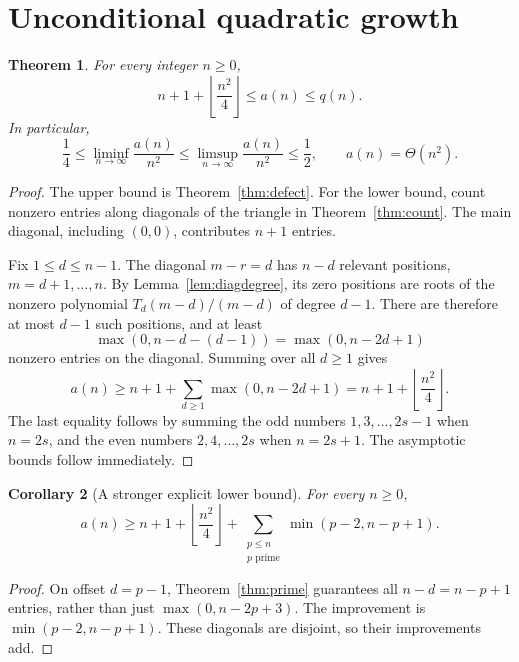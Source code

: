 \documentclass[11pt,a4paper]{article}
\numberwithin{equation}{section}
\newtheorem{theorem}{Theorem}[section]
\newtheorem{corollary}[theorem]{Corollary}
\theoremstyle{definition}
\theoremstyle{remark}
\begin{document}
\section{Unconditional quadratic growth}\label{sec:bounds}

\begin{theorem}\label{thm:bounds}
For every integer $n\ge0$,
\begin{equation}\label{eq:bounds}
 n+1+\left\lfloor\frac{n^2}{4}\right\rfloor\le a(n)\le q(n).
\end{equation}
In particular,
\[
 \frac14\le\liminf_{n\to\infty}\frac{a(n)}{n^2}
 \le\limsup_{n\to\infty}\frac{a(n)}{n^2}\le\frac12,
 \qquad a(n)=\Theta(n^2).
\]
\end{theorem}
\begin{proof}
The upper bound is Theorem~\ref{thm:defect}. For the lower bound, count
nonzero entries along diagonals of the triangle in
Theorem~\ref{thm:count}. The main diagonal, including $(0,0)$, contributes
$n+1$ entries.

Fix $1\le d\le n-1$. The diagonal $m-r=d$ has $n-d$ relevant positions,
$m=d+1,\ldots,n$. By Lemma~\ref{lem:diagdegree}, its zero positions are
roots of the nonzero polynomial $T_d(m-d)/(m-d)$ of degree $d-1$.
There are therefore at most $d-1$ such positions, and at least
\[
 \max(0,n-d-(d-1))=\max(0,n-2d+1)
\]
nonzero entries on the diagonal. Summing over all $d\ge1$ gives
\[
 a(n)\ge n+1+\sum_{d\ge1}\max(0,n-2d+1)
       =n+1+\left\lfloor\frac{n^2}{4}\right\rfloor.
\]
The last equality follows by summing the odd numbers $1,3,\ldots,2s-1$
when $n=2s$, and the even numbers $2,4,\ldots,2s$ when $n=2s+1$.
The asymptotic bounds follow immediately.
\end{proof}

\begin{corollary}[A stronger explicit lower bound]\label{cor:primebound}
For every $n\ge0$,
\begin{equation}\label{eq:primebound}
 a(n)\ge n+1+\left\lfloor\frac{n^2}{4}\right\rfloor
       +\sum_{\substack{p\le n\\p\text{ prime}}}\min(p-2,n-p+1).
\end{equation}
\end{corollary}
\begin{proof}
On offset $d=p-1$, Theorem~\ref{thm:prime} guarantees all $n-d=n-p+1$
entries, rather than just $\max(0,n-2p+3)$. The improvement is
$\min(p-2,n-p+1)$. These diagonals are disjoint, so their improvements add.
\end{proof}
\end{document}
